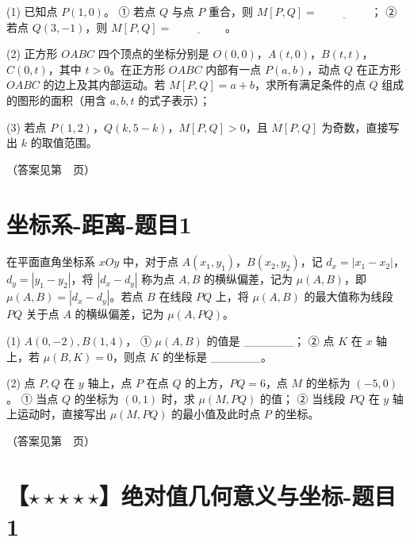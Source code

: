 (1) 已知点 \(P(1, 0)\)。  
① 若点 \(Q\) 与点 \(P\) 重合，则 \(M[P, Q] = \underline{\hspace{2cm}}\)；  
② 若点 \(Q(3, -1)\)，则 \(M[P, Q] = \underline{\hspace{2cm}}\)。  

\vspace{4cm}

(2) 正方形 \(OABC\) 四个顶点的坐标分别是 \(O(0, 0)\)，\(A(t, 0)\)，\(B(t, t)\)，\(C(0, t)\)，其中 \(t > 0\)。在正方形 \(OABC\) 内部有一点 \(P(a, b)\)，动点 \(Q\) 在正方形 \(OABC\) 的边上及其内部运动。若 \(M[P, Q] = a + b\)，求所有满足条件的点 \(Q\) 组成的图形的面积（用含 \(a, b, t\) 的式子表示）；  

\vspace{5cm}

(3) 若点 \(P(1, 2)\)，\(Q(k, 5 - k)\)，\(M[P, Q] > 0\)，且 \(M[P, Q]\) 为奇数，直接写出 \(k\) 的取值范围。

\vspace{5cm}


（答案见第~\pageref{坐标轴-新定义-题目1}~页）

\section{坐标系-距离-题目1}

在平面直角坐标系 \(xOy\) 中，对于点 \(A(x_1, y_1)\)，\(B(x_2, y_2)\)，记 \(d_x = |x_1 - x_2|\)，\(d_y = |y_1 - y_2|\)，将 \(|d_x - d_y|\) 称为点 \(A, B\) 的横纵偏差，记为 \(\mu(A, B)\)，即 \(\mu(A, B) = |d_x - d_y|\)。若点 \(B\) 在线段 \(PQ\) 上，将 \(\mu(A, B)\) 的最大值称为线段 \(PQ\) 关于点 \(A\) 的横纵偏差，记为 \(\mu(A, PQ)\)。

(1) \(A(0, -2), B(1, 4)\)，  
① \(\mu(A, B)\) 的值是 \_\_\_\_\_\_；  
② 点 \(K\) 在 \(x\) 轴上，若 \(\mu(B, K) = 0\)，则点 \(K\) 的坐标是 \_\_\_\_\_\_。

\vspace{4cm}

(2) 点 \(P, Q\) 在 \(y\) 轴上，点 \(P\) 在点 \(Q\) 的上方，\(PQ = 6\)，点 \(M\) 的坐标为 \((-5, 0)\)。  
① 当点 \(Q\) 的坐标为 \((0, 1)\) 时，求 \(\mu(M, PQ)\) 的值；  
② 当线段 \(PQ\) 在 \(y\) 轴上运动时，直接写出 \(\mu(M, PQ)\) 的最小值及此时点 \(P\) 的坐标。

\vspace{8cm}

（答案见第~\pageref{坐标系-距离-题目1}~页）


\section{【$\star\star\star\star\star$】绝对值几何意义与坐标-题目1}

